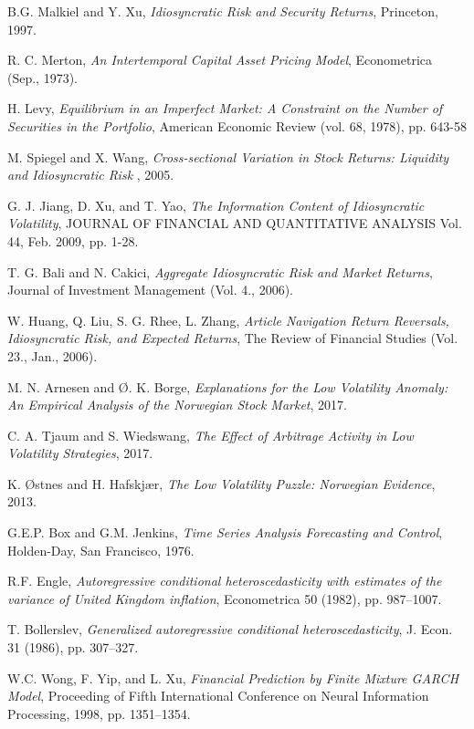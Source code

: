 \begin{thebibliography}{9}
B.G. Malkiel and Y. Xu, \textit{Idiosyncratic Risk and Security Returns}, Princeton, 1997.

R. C. Merton, \textit{An Intertemporal Capital Asset Pricing Model}, Econometrica (Sep., 1973).

H. Levy, \textit{Equilibrium in an Imperfect Market: A Constraint on the Number of Securities in the Portfolio}, American Economic Review (vol. 68, 1978), pp. 643-58

M. Spiegel and X. Wang, \textit{Cross-sectional Variation in Stock Returns:
Liquidity and Idiosyncratic Risk }, 2005.

G. J. Jiang, D. Xu, and T. Yao, \textit{The Information Content of Idiosyncratic Volatility}, JOURNAL OF FINANCIAL AND QUANTITATIVE ANALYSIS Vol. 44, Feb. 2009, pp. 1-28.

T. G. Bali and N. Cakici, \textit{Aggregate Idiosyncratic Risk and Market Returns}, Journal of Investment Management (Vol. 4., 2006).

W. Huang, Q. Liu, S. G. Rhee, L. Zhang, \textit{Article Navigation
Return Reversals, Idiosyncratic Risk, and Expected Returns}, The Review of Financial Studies (Vol. 23., Jan., 2006).

M. N. Arnesen and Ø. K. Borge, \textit{Explanations for the Low Volatility Anomaly: An Empirical Analysis of the Norwegian Stock Market}, 2017.

C. A. Tjaum and S. Wiedswang, \textit{The Effect of Arbitrage Activity in
Low Volatility Strategies}, 2017.

K. Østnes and H. Hafskjær, \textit{The Low Volatility Puzzle:
Norwegian Evidence}, 2013.


G.E.P. Box and G.M. Jenkins, \textit{Time Series Analysis Forecasting and Control}, Holden-Day, San Francisco, 1976.

R.F. Engle, \textit{Autoregressive conditional heteroscedasticity with estimates of the variance of United Kingdom inflation}, Econometrica 50 (1982), pp. 987–1007.

T. Bollerslev, \textit{Generalized autoregressive conditional heteroscedasticity}, J. Econ. 31 (1986), pp. 307–327.

W.C. Wong, F. Yip, and L. Xu, \textit{Financial Prediction by Finite Mixture GARCH Model}, Proceeding of Fifth International Conference on Neural Information Processing, 1998, pp. 1351–1354.


\end{thebibliography}
